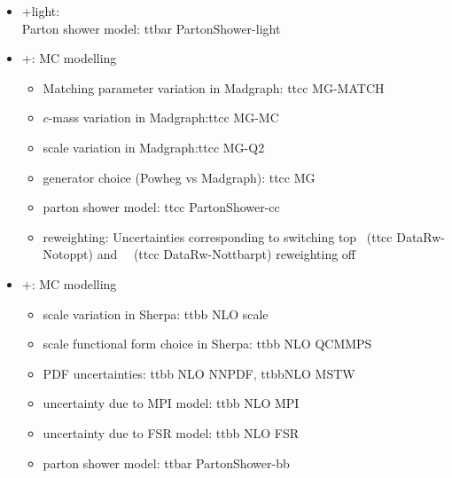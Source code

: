 \begin{itemize}
\item  \ttbar +light:  \\
Parton shower model: ttbar PartonShower-light

\item  \ttbar +\ccbar: MC modelling  
\begin{itemize}
 \item Matching parameter variation in Madgraph: ttcc MG-MATCH
 \item $c$-mass variation in Madgraph:ttcc MG-MC
 \item scale variation in Madgraph:ttcc MG-Q2
 \item generator choice (Powheg vs Madgraph): ttcc MG
 \item parton shower model: ttcc PartonShower-cc
 \item reweighting:  
Uncertainties corresponding to switching top \pt\ (ttcc DataRw-Notoppt) 
and \ttbar\ \pt\ (ttcc DataRw-Nottbarpt) reweighting off
\end{itemize}

\item  \ttbar +\bbbar: MC modelling  
\begin{itemize}
\item scale variation in Sherpa: ttbb NLO scale
\item scale functional form choice in  Sherpa: ttbb NLO QCMMPS
\item PDF uncertainties: ttbb NLO NNPDF, ttbbNLO MSTW
\item uncertainty due to MPI model: ttbb NLO MPI
\item uncertainty due to FSR model: ttbb NLO FSR
\item parton shower model: ttbar PartonShower-bb
\end{itemize}


\end{itemize}
